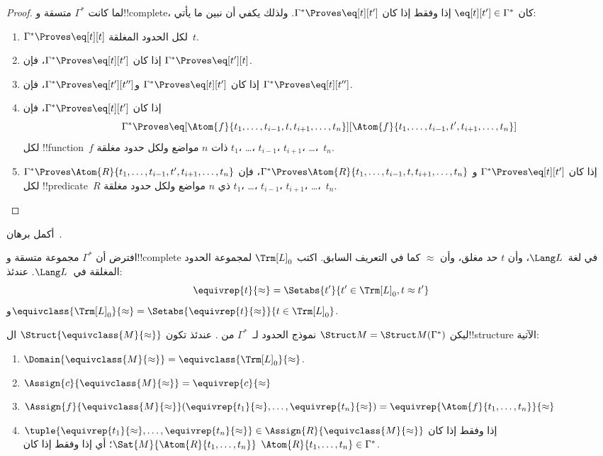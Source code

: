 \documentclass[../../../include/open-logic-section]{subfiles}
\begin{document}
\begin{proof}
لما كانت $\Gamma^*$ متسقة و!!{complete}، كان $\eq[t][t'] \in
\Gamma^*$ إذا وفقط إذا كان $\Gamma^* \Proves \eq[t][t']$. ولذلك يكفي
أن نبين ما يأتي:
\begin{enumerate}
\item $\Gamma^* \Proves \eq[t][t]$ لكل الحدود المغلقة~$t$.
\item إذا كان $\Gamma^* \Proves \eq[t][t']$، فإن
  $\Gamma^* \Proves \eq[t'][t]$.
\item إذا كان $\Gamma^* \Proves \eq[t][t']$ و$\Gamma^* \Proves
  \eq[t'][t'']$، فإن $\Gamma^* \Proves \eq[t][t'']$.
\item إذا كان $\Gamma^* \Proves \eq[t][t']$، فإن
\[
\Gamma^* \Proves
\eq[\Atom{f}{t_1,\dots,t_{i-1},t,t_{i+1},\dots,t_n}][\Atom{f}{t_1,\dots,t_{i-1},t',t_{i+1},\dots,t_n}]
\]
لكل !!{function}~$f$ ذات $n$ مواضع ولكل حدود مغلقة $t_1$، \dots،
$t_{i-1}$، $t_{i+1}$، \dots،~$t_n$.
\item إذا كان $\Gamma^* \Proves \eq[t][t']$ و
$\Gamma^* \Proves
\Atom{R}{t_1,\dots,t_{i-1},t,t_{i+1},\dots,t_n}$، فإن
$\Gamma^* \Proves \Atom{R}{t_1,\dots,t_{i-1},t',t_{i+1},\dots,t_n}$
لكل !!{predicate}~$R$ ذي $n$ مواضع ولكل حدود مغلقة $t_1$، \dots،
$t_{i-1}$، $t_{i+1}$، \dots،~$t_n$.
\end{enumerate}
\end{proof}

\begin{prob}
أكمل برهان~.
\end{prob}

\begin{defn}
افترض أن $\Gamma^*$ مجموعة متسقة و!!{complete} في لغة~$\Lang L$، وأن
$t$ حد مغلق، وأن $\approx$ كما في التعريف السابق. اكتب $\Trm[L]_0$
لمجموعة الحدود المغلقة في~$\Lang L$. عندئذ:
\[
\equivrep{t}{\approx} = \Setabs{t'}{t'\in \Trm[L]_0, t \approx t'}
\]
و$\equivclass{\Trm[L]_0}{\approx} = \Setabs{\equivrep{t}{\approx}}{t \in \Trm[L]_0}$.
\end{defn}

\begin{defn}
ليكن $\Struct M = \Struct M(\Gamma^*)$ نموذج الحدود لـ~$\Gamma^*$ من
. عندئذ تكون
$\Struct{\equivclass{M}{\approx}}$ ال!!{structure} الآتية:
\begin{enumerate}
\item $\Domain{\equivclass{M}{\approx}} = \equivclass{\Trm[L]_0}{\approx}$.
\item $\Assign{c}{\equivclass{M}{\approx}} = \equivrep{c}{\approx}$
\item $\Assign{f}{\equivclass{M}{\approx}}(\equivrep{t_1}{\approx}, \dots,
  \equivrep{t_n}{\approx}) = \equivrep{\Atom{f}{t_1,\dots, t_n}}{\approx}$
\item $\tuple{\equivrep{t_1}{\approx}, \dots, \equivrep{t_n}{\approx}} \in
  \Assign{R}{\equivclass{M}{\approx}}$ إذا وفقط إذا كان
  $\Sat{M}{\Atom{R}{t_1,\dots, t_n}}$؛ أي إذا وفقط إذا كان
  $\Atom{R}{t_1,\dots, t_n} \in \Gamma^*$.
\end{enumerate}
\end{defn}
\end{document}
